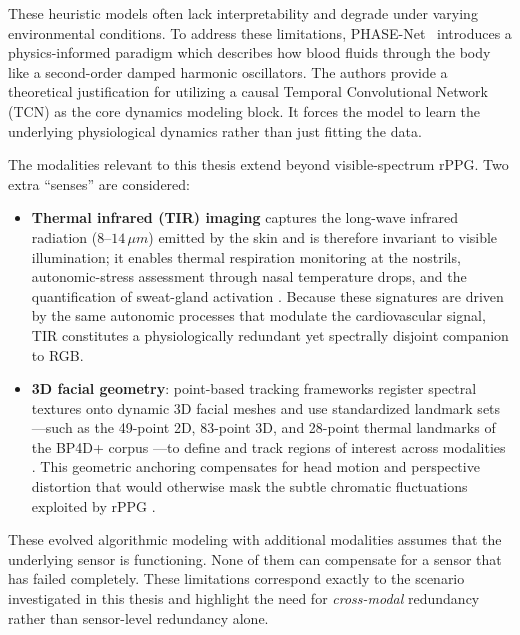 These heuristic models often lack interpretability and degrade under varying environmental conditions. 
To address these limitations, PHASE-Net~\cite{zhao2025phasenet} introduces a physics-informed paradigm which describes how blood fluids through
the body like a second-order damped harmonic oscillators. 
The authors provide a theoretical justification for utilizing a causal Temporal Convolutional Network (TCN) as the core dynamics modeling block.
It forces the model to learn the underlying physiological dynamics rather than just fitting the data.

The modalities relevant to this thesis extend beyond visible-spectrum rPPG. Two
extra ``senses'' are considered:
\begin{itemize}
    \item \textbf{Thermal infrared (TIR) imaging} captures the long-wave
    infrared radiation ($8$--$14\,\mu m$) emitted by the skin and is therefore
    invariant to visible illumination; it enables thermal respiration
    monitoring at the nostrils, autonomic-stress assessment through nasal
    temperature drops, and the quantification of sweat-gland activation
    \cite{cho2019physiological}. Because these signatures are driven by the
    same autonomic processes that modulate the cardiovascular signal, TIR
    constitutes a physiologically redundant yet spectrally disjoint companion
    to RGB.
    \item \textbf{3D facial geometry}: point-based tracking frameworks register
    spectral textures onto dynamic 3D facial meshes and use standardized
    landmark sets---such as the 49-point 2D, 83-point 3D, and 28-point thermal
    landmarks of the BP4D+ corpus \cite{zhang2014bp4d}---to define and track
    regions of interest across modalities \cite{hassanpour2025contactless}.
    This geometric anchoring compensates for head motion and perspective
    distortion that would otherwise mask the subtle chromatic fluctuations
    exploited by rPPG \cite{cheng2024contactless}.
\end{itemize}

These evolved algorithmic modeling with additional modalities assumes that the underlying sensor is functioning. 
None of them can compensate for a sensor that has failed completely. These limitations
correspond exactly to the scenario investigated in this thesis and highlight the
need for \emph{cross-modal} redundancy rather than sensor-level redundancy alone.

